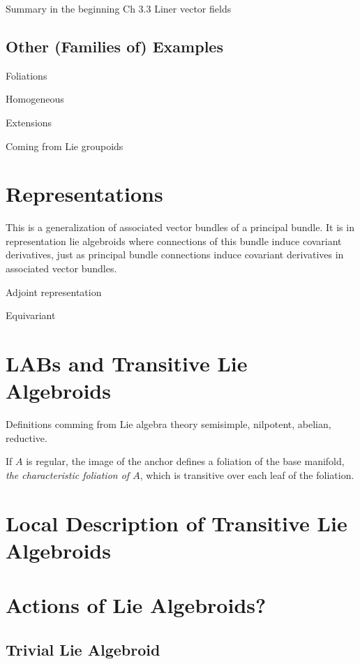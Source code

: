 Summary in the beginning Ch 3.3 Liner vector fields

\subsection{Other (Families of) Examples}

Foliations

Homogeneous

Extensions

Coming from Lie groupoids

\section{Representations}

This is a generalization of associated vector bundles of a principal bundle. It is in representation lie algebroids where connections of this bundle induce covariant derivatives, just as principal bundle connections induce covariant derivatives in associated vector bundles.

Adjoint representation

Equivariant
\section{LABs and Transitive Lie Algebroids}

Definitions comming from Lie algebra theory semisimple, nilpotent, abelian, reductive.

If $A$ is regular, the image of the anchor defines a foliation of the base manifold, \emph{the characteristic foliation of $A$}, which is transitive over each leaf of the foliation.

\section{Local Description of Transitive Lie Algebroids}

\section{Actions of Lie Algebroids?}\subsection{Trivial Lie Algebroid}
